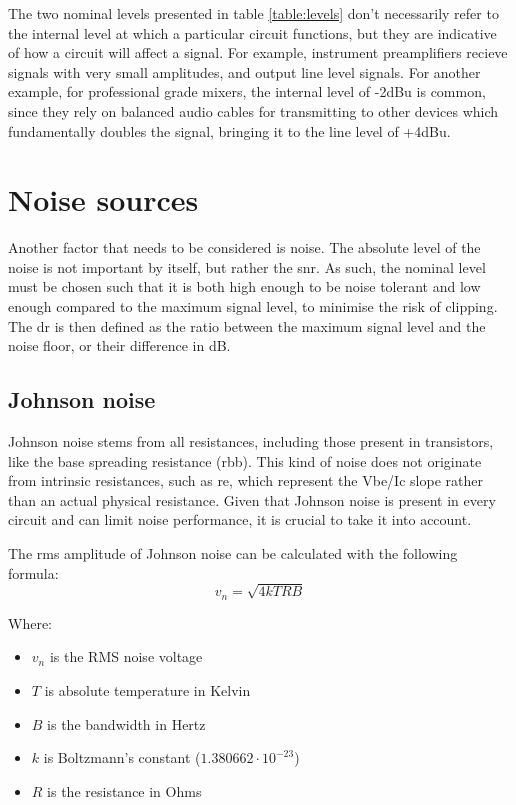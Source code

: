 The two nominal levels presented in table \ref{table:levels} don't
necessarily refer to the internal level at which a particular circuit
functions, but they are indicative of how a circuit will affect a signal.
For example, instrument preamplifiers recieve signals with very small
amplitudes, and output line level signals.
For another example, for professional grade mixers, the internal level of -2dBu
is common, since they rely on balanced audio cables for transmitting to other
devices which fundamentally doubles the signal, bringing it to the line level
of +4dBu.

\section{Noise sources}

Another factor that needs to be considered is noise. The absolute level of the
noise is not important by itself, but rather the \ac{snr}. As such, the nominal
level must be chosen such that it is both high enough to be noise tolerant and
low enough compared to the maximum signal level, to minimise the risk of
clipping. The \ac{dr} is then defined as the ratio between the maximum
signal level and the noise floor, or their difference in dB.

\subsection{Johnson noise}

Johnson noise stems from all resistances, including those present in
transistors, like the base spreading resistance (rbb). This kind of noise does
not originate from intrinsic resistances, such as re, which represent the
Vbe/Ic slope rather than an actual physical resistance. Given that Johnson
noise is present in every circuit and can limit noise performance, it is
crucial to take it into account.

The \ac{rms} amplitude of Johnson noise can be calculated with the following
formula:
\begin{equation}
    v_n = \sqrt{4kTRB}
\end{equation}

Where:
\begin{itemize}
    \item $v_n$ is the RMS noise voltage
    \item $T$ is absolute temperature in Kelvin
    \item $B$ is the bandwidth in Hertz
    \item $k$ is Boltzmann's constant ($1.380662 \cdot 10^{-23}$)
    \item $R$ is the resistance in Ohms
\end{itemize}


